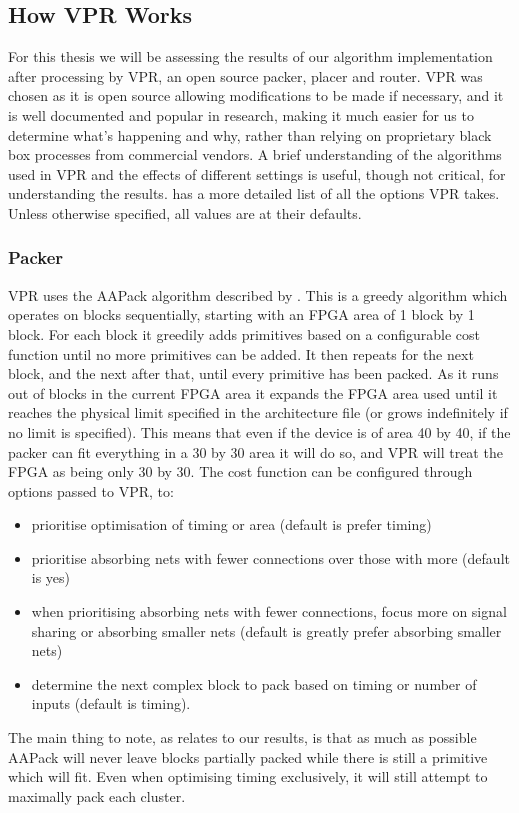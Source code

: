 \documentclass[12pt,final,oneside]{dwThesis} %
\begin{document}
\subsection{How \acs{VPR} Works}\label{VPRSection}
For this thesis we will be assessing the results of our algorithm implementation after processing by \ac{VPR}, an open source packer, placer and router. \ac{VPR} was chosen as it is open source allowing modifications to be made if necessary, and it is well documented and popular in research, making it much easier for us to determine what's happening and why, rather than relying on proprietary black box processes from commercial vendors.
A brief understanding of the algorithms used in \ac{VPR} and the effects of different settings is useful, though not critical, for understanding the results. \cite{VPRManual} has a more detailed list of all the options \ac{VPR} takes. Unless otherwise specified, all values are at their defaults.
\subsubsection{Packer}
\ac{VPR} uses the AAPack algorithm described by \cite{AAPackThesis}. This is a greedy algorithm which operates on blocks sequentially, starting with an \ac{FPGA} area of 1 block by 1 block. For each block it greedily adds primitives based on a configurable cost function until no more primitives can be added. It then repeats for the next block, and the next after that, until every primitive has been packed. As it runs out of blocks in the current \ac{FPGA} area it expands the \ac{FPGA} area used until it reaches the physical limit specified in the architecture file (or grows indefinitely if no limit is specified). This means that even if the device is of area 40 by 40, if the packer can fit everything in a 30 by 30 area it will do so, and \ac{VPR} will treat the \ac{FPGA} as being only 30 by 30.
The cost function can be configured through options passed to \ac{VPR}, to\cite{VPRManual}:
\begin{itemize}
 \item prioritise optimisation of timing or area (default is prefer timing)
 \item prioritise absorbing nets with fewer connections over those with more (default is yes)
 \item when prioritising absorbing nets with fewer connections, focus more on signal sharing or absorbing smaller nets (default is greatly prefer absorbing smaller nets)
 \item determine the next complex block to pack based on timing or number of inputs (default is timing).
\end{itemize}
The main thing to note, as relates to our results, is that as much as possible AAPack will never leave blocks partially packed while there is still a primitive which will fit. Even when optimising timing exclusively, it will still attempt to maximally pack each cluster.
\end{document}
